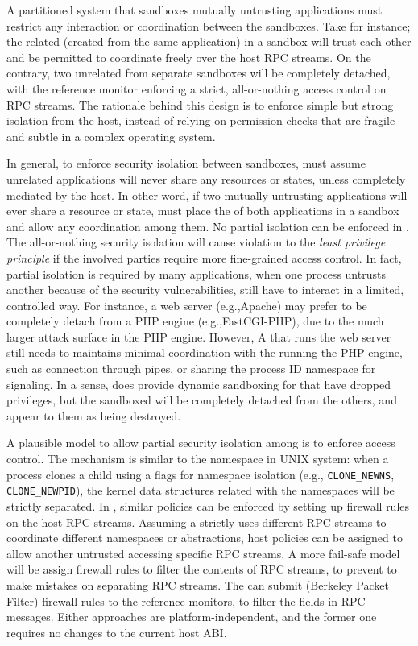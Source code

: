 A partitioned system that sandboxes mutually untrusting applications
must restrict any interaction or coordination between the sandboxes.
Take \graphene{} for instance;
the related \picoprocs{} (created from the same application)
in a sandbox will trust each other
and be permitted to coordinate freely over the host RPC streams.
On the contrary, two unrelated \picoprocs{} from separate sandboxes will be completely detached,
with the \graphene{} reference monitor enforcing a strict,
all-or-nothing access control on RPC streams.
The rationale behind this design is to enforce simple but strong isolation from the host,
instead of relying on permission checks that are fragile and subtle
in a complex operating system.

In general, to enforce security isolation between sandboxes,
\graphene{} must assume
unrelated applications will never share any resources or states,
unless completely mediated by the host.
In other word, if two mutually untrusting applications
will ever share a resource or state,
\graphene{} must place the \picoprocs{} of both applications in a sandbox
and allow any coordination among them.
No partial isolation can be enforced in \graphene{}.
The all-or-nothing security isolation will
cause violation to the \emph{least privilege principle}
if the involved parties
require more fine-grained access control.
In fact, partial isolation is required by many applications,
when one process untrusts another because of the security vulnerabilities,
still have to interact in a limited, controlled way.
For instance,
a web server (e.g.,Apache) may prefer to be completely detach from a PHP engine (e.g.,FastCGI-PHP),
due to the much larger attack surface in the PHP engine.
However, A \picoproc{} that runs the web server
still needs to maintains minimal coordination with the \picoproc{} running the PHP engine,
such as connection through pipes,
or sharing the process ID namespace for signaling.
In a sense, \graphene{} does provide dynamic sandboxing
for \picoprocs{} that have dropped privileges,
but the sandboxed \picoproc{} will be completely detached from the others,
and appear to them as being destroyed.

A plausible model to allow partial security isolation among \picoprocs{}
is to enforce  access control.
The mechanism is similar to the namespace in UNIX system:
when a process clones a child using a flags for namespace isolation
(e.g., {\tt CLONE\_NEWNS}, {\tt CLONE\_NEWPID}),
the kernel data structures related with the namespaces will be strictly separated.
In \graphene{}, similar policies can be enforced
by setting up firewall rules on the host RPC streams.
Assuming a \picoproc{} strictly uses different RPC streams to coordinate different namespaces or abstractions,
host policies can be assigned to allow another untrusted
\picoproc{} accessing specific RPC streams.
A more fail-safe model will be assign firewall rules to filter the contents of RPC streams,
to prevent \picoprocs{} to make mistakes on separating RPC streams.
The \picoprocs{} can submit  (Berkeley Packet Filter) firewall rules to the reference monitors, to filter the fields in RPC messages.
Either approaches are platform-independent, and the former one requires no changes to the current host ABI.


